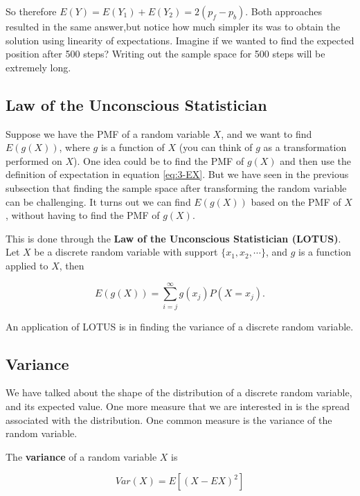 \documentclass[
]{book}
\begin{document}
So therefore \(E(Y) = E(Y_1) + E(Y_2) = 2(p_f - p_b)\). Both approaches resulted in the same answer,but notice how much simpler its was to obtain the solution using linearity of expectations. Imagine if we wanted to find the expected position after 500 steps? Writing out the sample space for 500 steps will be extremely long.

\subsection{Law of the Unconscious Statistician}\label{law-of-the-unconscious-statistician}

Suppose we have the PMF of a random variable \(X\), and we want to find \(E(g(X))\), where \(g\) is a function of \(X\) (you can think of \(g\) as a transformation performed on \(X\)). One idea could be to find the PMF of \(g(X)\) and then use the definition of expectation in equation \eqref{eq:3-EX}. But we have seen in the previous subsection that finding the sample space after transforming the random variable can be challenging. It turns out we can find \(E(g(X))\) based on the PMF of \(X\), without having to find the PMF of \(g(X)\).

This is done through the \textbf{Law of the Unconscious Statistician (LOTUS)}. Let \(X\) be a discrete random variable with support \(\{x_1, x_2, \cdots \}\), and \(g\) is a function applied to \(X\), then

\begin{equation} 
E(g(X)) = \sum_{i=j}^{\infty} g(x_j) P(X=x_j).
\label{eq:3-lotus}
\end{equation}

An application of LOTUS is in finding the variance of a discrete random variable.

\subsection{Variance}\label{variance}

We have talked about the shape of the distribution of a discrete random variable, and its expected value. One more measure that we are interested in is the spread associated with the distribution. One common measure is the variance of the random variable.

The \textbf{variance} of a random variable \(X\) is

\begin{equation} 
Var(X) = E[(X - EX)^2]
\label{eq:3-var2}
\end{equation}
\end{document}

